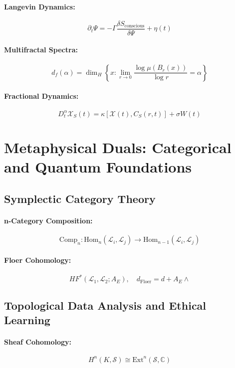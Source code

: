 \documentclass[11pt]{article}
\newcommand{\Xi}{\mathcal{X}}
\begin{document}
\paragraph{Langevin Dynamics:}
\[
\partial_t \Psi = -\Gamma \frac{\delta S_{\text{conscious}}}{\delta \Psi} + \eta(t)
\]

\paragraph{Multifractal Spectra:}
\[
d_f(\alpha) = \dim_H \left\{ x : \lim_{r \to 0} \frac{\log \mu(B_r(x))}{\log r} = \alpha \right\}
\]

\paragraph{Fractional Dynamics:}
\[
D_t^\alpha \Xi_S(t) = \kappa [ \Xi(t), C_S(r, t) ] + \sigma W(t)
\]

\section{Metaphysical Duals: Categorical and Quantum Foundations}

\subsection{Symplectic Category Theory}

\paragraph{n-Category Composition:}
\[
\text{Comp}_n: \text{Hom}_n(\mathcal{L}_i, \mathcal{L}_j) \to \text{Hom}_{n-1}(\mathcal{L}_i, \mathcal{L}_j)
\]

\paragraph{Floer Cohomology:}
\[
HF^*(\mathcal{L}_1, \mathcal{L}_2; A_E), \quad d_{\text{Floer}} = d + A_E \wedge
\]

\subsection{Topological Data Analysis and Ethical Learning}

\paragraph{Sheaf Cohomology:}
\[
H^n(K, \mathcal{S}) \cong \text{Ext}^n(\mathcal{S}, \mathbb{C})
\]
\end{document}
